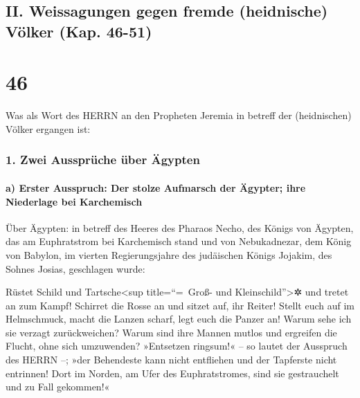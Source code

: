\hypertarget{ii.-weissagungen-gegen-fremde-heidnische-vuxf6lker-kap.-46-51}{%
\subsection{II. Weissagungen gegen fremde (heidnische) Völker (Kap.
46-51)}\label{ii.-weissagungen-gegen-fremde-heidnische-vuxf6lker-kap.-46-51}}

\hypertarget{section-45}{%
\section{46}\label{section-45}}

Was als Wort des HERRN an den Propheten Jeremia in betreff
der (heidnischen) Völker ergangen ist:

\hypertarget{zwei-ausspruxfcche-uxfcber-uxe4gypten}{%
\subsubsection{1. Zwei Aussprüche über
Ägypten}\label{zwei-ausspruxfcche-uxfcber-uxe4gypten}}

\hypertarget{a-erster-ausspruch-der-stolze-aufmarsch-der-uxe4gypter-ihre-niederlage-bei-karchemisch}{%
\paragraph{a) Erster Ausspruch: Der stolze Aufmarsch der Ägypter; ihre
Niederlage bei
Karchemisch}\label{a-erster-ausspruch-der-stolze-aufmarsch-der-uxe4gypter-ihre-niederlage-bei-karchemisch}}

Über Ägypten: in betreff des Heeres des Pharaos Necho, des
Königs von Ägypten, das am Euphratstrom bei Karchemisch stand und von
Nebukadnezar, dem König von Babylon, im vierten Regierungsjahre des
judäischen Königs Jojakim, des Sohnes Josias, geschlagen wurde:

Rüstet Schild und Tartsche\textless sup title=``=~Groß-
und Kleinschild''\textgreater✲ und tretet an zum Kampf!
Schirret die Rosse an und sitzet auf, ihr Reiter! Stellt
euch auf im Helmschmuck, macht die Lanzen scharf, legt euch die Panzer
an! Warum sehe ich sie verzagt zurückweichen? Warum sind
ihre Mannen mutlos und ergreifen die Flucht, ohne sich umzuwenden?
»Entsetzen ringsum!« -- so lautet der Ausspruch des HERRN --;
»der Behendeste kann nicht entfliehen und der Tapferste
nicht entrinnen! Dort im Norden, am Ufer des Euphratstromes, sind sie
gestrauchelt und zu Fall gekommen!«


